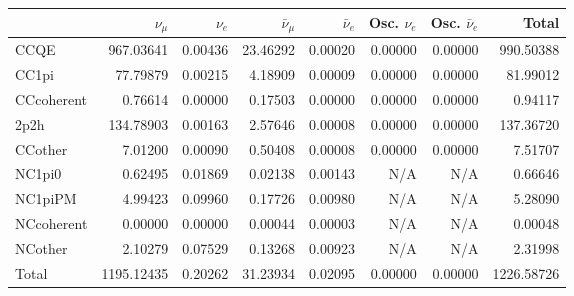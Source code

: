 \begin{tabular} { | l ||r | r | r | r | r | r | | r | }
\hline
              & $\nu_\mu$            & $\nu_e$              & $\bar{\nu}_{\mu}$    & $\bar{\nu}_{e}$      & Osc. $\nu_e$         & Osc. $\bar{\nu}_{e}$ & Total                \\ \hline\hline
 CCQE         & 967.03641            & 0.00436              & 23.46292             & 0.00020              & 0.00000              & 0.00000              & 990.50388            \\ \hline
 CC1pi        & 77.79879             & 0.00215              & 4.18909              & 0.00009              & 0.00000              & 0.00000              & 81.99012             \\ \hline
 CCcoherent   & 0.76614              & 0.00000              & 0.17503              & 0.00000              & 0.00000              & 0.00000              & 0.94117              \\ \hline
 2p2h         & 134.78903            & 0.00163              & 2.57646              & 0.00008              & 0.00000              & 0.00000              & 137.36720            \\ \hline
 CCother      & 7.01200              & 0.00090              & 0.50408              & 0.00008              & 0.00000              & 0.00000              & 7.51707              \\ \hline
 NC1pi0       & 0.62495              & 0.01869              & 0.02138              & 0.00143              & N/A                  & N/A                  & 0.66646              \\ \hline
 NC1piPM      & 4.99423              & 0.09960              & 0.17726              & 0.00980              & N/A                  & N/A                  & 5.28090              \\ \hline
 NCcoherent   & 0.00000              & 0.00000              & 0.00044              & 0.00003              & N/A                  & N/A                  & 0.00048              \\ \hline
 NCother      & 2.10279              & 0.07529              & 0.13268              & 0.00923              & N/A                  & N/A                  & 2.31998              \\ \hline
\hline
 Total        & 1195.12435           & 0.20262              & 31.23934             & 0.02095              & 0.00000              & 0.00000              & 1226.58726           \\ \hline

\end{tabular}

